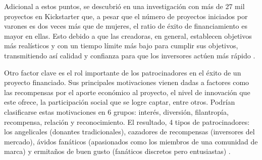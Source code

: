 Adicional a estos puntos, se descubrió en una investigación con más de 27 mil proyectos en Kickstarter que, a pesar que el número de proyectos iniciados por varones es dos veces más que de mujeres, el ratio de éxito de financiamiento es mayor en ellas. Esto debido a que las creadoras, en general, establecen objetivos más realísticos y con un tiempo límite más bajo para cumplir sus objetivos, transmitiendo así calidad y confianza para que los inversores actúen más rápido \parencite{cr_ullah2020crowdfunding}.

Otro factor clave es el rol importante de los patrocinadores en el éxito de un proyecto financiado. Sus principales motivaciones vienen dadas a factores como las recompensas por el aporte económico al proyecto, el nivel de innovación que este ofrece, la participación social que se logre captar, entre otros. Podrían clasificarse estas motivaciones en 6 grupos: interés, diversión, filantropía, recompensa, relación y reconocimiento. El resultado, 4 tipos de patrocinadores: los angelicales (donantes tradicionales), cazadores de recompensas (inversores del mercado), ávidos fanáticos (apasionados como los miembros de una comunidad de marca) y ermitaños de buen gusto (fanáticos discretos pero entusiastas) \parencite{cr_tung2019backers}.